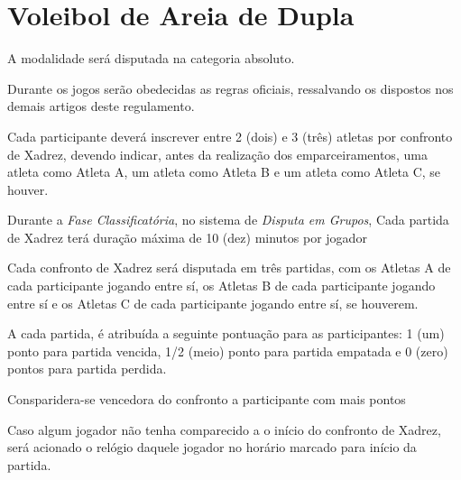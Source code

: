 {\let\clearpage\relax \chapter{Voleibol de Areia de Dupla}}

\begin{article}
	A modalidade será disputada na categoria absoluto.
\end{article}

\begin{article}
	Durante os jogos serão obedecidas as regras oficiais, ressalvando os dispostos nos demais artigos deste regulamento.
\end{article}

\begin{article}
	Cada participante deverá inscrever entre 2 (dois) e 3 (três) atletas por confronto de Xadrez, devendo indicar, antes da realização dos emparceiramentos, uma atleta como Atleta A, um atleta como Atleta B e um atleta como Atleta C, se houver.
\end{article}

\begin{article}
	Durante a \textit{Fase Classificatória}, no sistema de \textit{Disputa em Grupos}, Cada partida de Xadrez terá duração máxima de 10 (dez) minutos por jogador
\end{article}

\begin{article}
	Cada confronto de Xadrez será disputada em três partidas, com os Atletas A de cada participante jogando entre sí, os Atletas B de cada participante jogando entre sí e os Atletas C de cada participante jogando entre sí, se houverem.

	\begin{xparagraph}
		A cada partida, é atribuída a seguinte pontuação para as participantes: 1 (um) ponto para partida vencida, 1/2 (meio) ponto para partida empatada e 0 (zero) pontos para partida perdida.
	\end{xparagraph}

	\begin{xparagraph}
		Consparidera-se vencedora do confronto a participante com mais pontos
	\end{xparagraph}

	\begin{xparagraph}
		Caso algum jogador não tenha comparecido a o início do confronto de Xadrez, será acionado o relógio daquele jogador no horário marcado para início da partida.
	\end{xparagraph}
\end{article}

